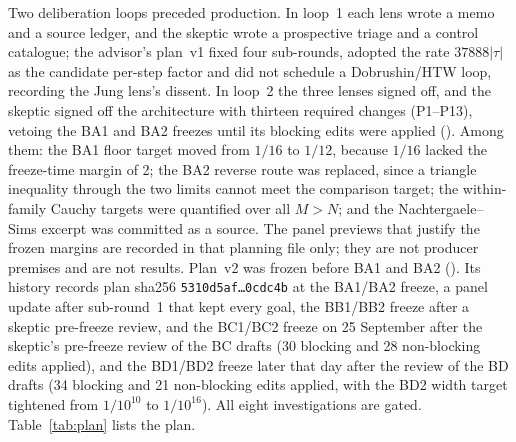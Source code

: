 Two deliberation loops preceded production. In loop~1 each lens wrote a memo
and a source ledger, and the skeptic wrote a prospective triage and a control
catalogue; the advisor's plan~v1 fixed four sub-rounds, adopted the rate
$37888|\tau|$ as the candidate per-step factor and did not schedule a
Dobrushin/HTW loop, recording the Jung lens's dissent. In loop~2 the three
lenses signed off, and the skeptic signed off the architecture with thirteen
required changes (P1--P13), vetoing the BA1 and BA2 freezes until its blocking
edits were applied
().
Among them: the BA1 floor target moved from $1/16$ to $1/12$, because $1/16$
lacked the freeze-time margin of 2; the BA2 reverse route was replaced, since
a triangle inequality through the two limits cannot meet the comparison
target; the within-family Cauchy targets were quantified over all $M>N$; and
the Nachtergaele--Sims excerpt was committed as a source. The panel previews
that justify the frozen margins are recorded in that planning file only; they
are not producer premises and are not results. Plan~v2 was frozen before BA1
and BA2 (). Its
history records plan sha256 \texttt{5310d5af\ldots0cdc4b} at the BA1/BA2
freeze, a panel update after sub-round~1 that kept every goal, the BB1/BB2
freeze after a skeptic pre-freeze review, and the BC1/BC2 freeze on 25
September after the skeptic's pre-freeze review of the BC drafts (30
blocking and 28 non-blocking edits applied), and the BD1/BD2 freeze later
that day after the review of the BD drafts (34 blocking and 21 non-blocking
edits applied, with the BD2 width target tightened from $1/10^{10}$ to
$1/10^{16}$). All eight investigations are gated. Table~\ref{tab:plan} lists
the plan.

